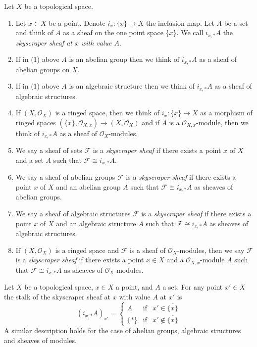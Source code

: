 \begin{definition}
\label{definition-skyscraper-sheaf}
Let $X$ be a topological space.
\begin{enumerate}
\item Let $x \in X$ be a point. Denote $i_x : \{x\} \to X$ the inclusion map.
Let $A$ be a set and think of $A$ as a sheaf on the one point space $\{x\}$.
We call $i_{x, *}A$ the {\it skyscraper sheaf at $x$ with value $A$}.
\item If in (1) above $A$ is an abelian group then we think of
$i_{x, *}A$ as a sheaf of abelian groups on $X$.
\item If in (1) above $A$ is an algebraic structure then we think
of $i_{x, *}A$ as a sheaf of algebraic structures.
\item If $(X, \mathcal{O}_X)$ is a ringed space, then we think
of $i_x : \{x\} \to X$ as a morphism of ringed spaces
$(\{x\}, \mathcal{O}_{X, x}) \to (X, \mathcal{O}_X)$
and if $A$ is a $\mathcal{O}_{X, x}$-module, then we think
of $i_{x, *}A$ as a sheaf of $\mathcal{O}_X$-modules.
\item We say a sheaf of sets $\mathcal{F}$ is a {\it skyscraper sheaf}
if there exists a point $x$ of $X$ and a set $A$ such
that $\mathcal{F} \cong i_{x, *}A$.
\item We say a sheaf of abelian groups $\mathcal{F}$ is a
{\it skyscraper sheaf} if there exists a point $x$ of $X$
and an abelian group $A$ such that $\mathcal{F} \cong i_{x, *}A$
as sheaves of abelian groups.
\item We say a sheaf of algebraic structures $\mathcal{F}$ is a
{\it skyscraper sheaf} if there exists a point $x$ of $X$
and an algebraic structure $A$ such that $\mathcal{F} \cong i_{x, *}A$
as sheaves of algebraic structures.
\item If $(X, \mathcal{O}_X)$ is a ringed space and
$\mathcal{F}$ is a sheaf of $\mathcal{O}_X$-modules, then
we say $\mathcal{F}$ is a {\it skyscraper sheaf} if there
exists a point $x \in X$ and a $\mathcal{O}_{X, x}$-module
$A$ such that $\mathcal{F} \cong i_{x, *}A$
as sheaves of $\mathcal{O}_X$-modules.
\end{enumerate}
\end{definition}

\begin{lemma}
\label{lemma-skyscraper-stalks}
Let $X$ be a topological space, $x \in X$ a point, and
$A$ a set. For any point $x' \in X$ the stalk of the
skyscraper sheaf at $x$ with value $A$ at $x'$ is
$$
(i_{x, *}A)_{x'} =
\left\{
\begin{matrix}
A & \text{if} & x' \in \overline{\{x\}} \\
\{*\} & \text{if} & x' \not\in \overline{\{x\}}
\end{matrix}
\right.
$$
A similar description holds for the case of
abelian groups, algebraic structures and
sheaves of modules.
\end{lemma}

